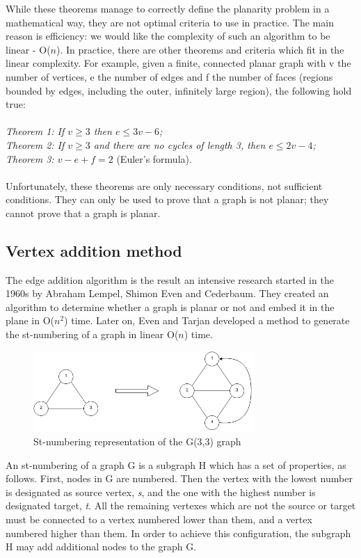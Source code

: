 While these theorems manage to correctly define the planarity problem in a mathematical way, they are not optimal 
criteria to use in practice. The main reason is efficiency: we would like the complexity of such an algorithm 
to be linear - O($n$). In practice, there are other theorems and criteria which fit in the linear complexity. For 
example, given a finite, connected planar graph with v the number of vertices, e the number of edges and 
f the number of faces (regions bounded by edges, including the outer, infinitely large region), the following 
hold true:
\\ 
\\ \textit{Theorem 1: If $v \geq 3$ then $e \leq 3v-6$;}
\\ \textit{Theorem 2: If $v \geq 3$ and there are no cycles of length 3, then $e \leq 2v-4$;}
\\ \textit{Theorem 3: $v - e + f = 2$} (Euler's formula).
\\ 
\\ Unfortunately, these theorems are only necessary conditions, not sufficient conditions. They can only be used to 
prove that a graph is not planar; they cannot prove that a graph is planar.

\subsection{Vertex addition method}

The edge addition algorithm is the result an intensive research started in the 1960s by Abraham Lempel, Shimon Even
and Cederbaum. They created an algorithm to determine whether a graph is planar or not and embed it in the plane in 
O($n^{2}$) time. Later on, Even and Tarjan developed a method to generate the st-numbering of a graph in linear O(${n}$) time.

\begin{figure}[ht] \centering
\includegraphics[width=0.75\textwidth]{img/algdesing/st_numbering.png}
\caption{St-numbering representation of the G(3,3) graph} \end{figure}

An st-numbering\cite{even1976computing} of a graph G is a subgraph H which has a set of properties, as follows. First, nodes in G are numbered. 
Then the vertex with the lowest number is designated as source vertex, \emph{s}, and the one with the highest number 
is designated target, \emph{t}. All the remaining vertexes which are not the source or target must be connected to a 
vertex numbered lower than them, and a vertex numbered higher than them. In order to achieve this configuration, the 
subgraph H may add additional nodes to the graph G.

